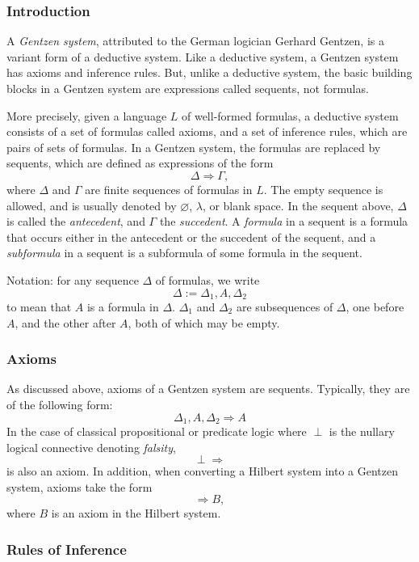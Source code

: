 \documentclass[12pt]{article}
\begin{document}
\subsubsection*{Introduction}

A \emph{Gentzen system}, attributed to the German logician Gerhard Gentzen, is a variant form of a deductive system.  Like a deductive system, a Gentzen system has axioms and inference rules.  But, unlike a deductive system, the basic building blocks in a Gentzen system are expressions called sequents, not formulas.

More precisely, given a language $L$ of well-formed formulas, a deductive system consists of a set of formulas called axioms, and a set of inference rules, which are pairs of sets of formulas.  In a Gentzen system, the formulas are replaced by sequents, which are defined as expressions of the form $$\Delta \Rightarrow \Gamma,$$ where $\Delta$ and $\Gamma$ are finite sequences of formulas in $L$.  The empty sequence is allowed, and is usually denoted by $\varnothing$, $\lambda$, or blank space.  In the sequent above, $\Delta$ is called the \emph{antecedent}, and $\Gamma$ the \emph{succedent}.  A \emph{formula} in a sequent is a formula that occurs either in the antecedent or the succedent of the sequent, and a \emph{subformula} in a sequent is a subformula of some formula in the sequent.

Notation: for any sequence $\Delta$ of formulas, we write $$\Delta:=\Delta_1, A, \Delta_2$$ to mean that $A$ is a formula in $\Delta$.  $\Delta_1$ and $\Delta_2$ are subsequences of $\Delta$, one before $A$, and the other after $A$, both of which may be empty.

\subsubsection*{Axioms}

As discussed above, axioms of a Gentzen system are sequents.  Typically, they are of the following form:
$$\Delta_1,A,\Delta_2\Rightarrow A$$
In the case of classical propositional or predicate logic where $\perp$ is the nullary logical connective denoting \emph{falsity}, $$\perp\Rightarrow $$ is also an axiom.  In addition, when converting a Hilbert system into a Gentzen system, axioms take the form $$\Rightarrow B,$$ where $B$ is an axiom in the Hilbert system.

\subsubsection*{Rules of Inference}
\end{document}
